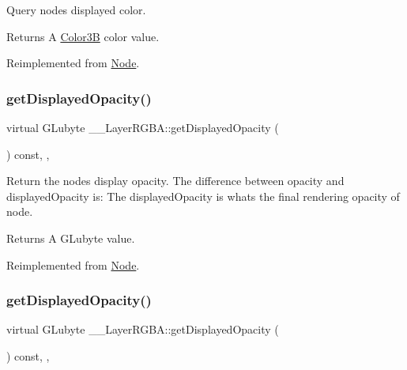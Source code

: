 Query node\textquotesingle{}s displayed color. \begin{DoxyReturn}{Returns}
A \hyperlink{structColor3B}{Color3B} color value. 
\end{DoxyReturn}


Reimplemented from \hyperlink{classNode_a899760bbad414bfbe9fb51473e99c3eb}{Node}.

\mbox{\label{class____LayerRGBA_a3c94f57397e6c53127d1176d14ab25fe}} 
\subsubsection{\texorpdfstring{get\+Displayed\+Opacity()}{getDisplayedOpacity()}\hspace{0.1cm}{\footnotesize\ttfamily [1/2]}}
{\footnotesize\ttfamily virtual G\+Lubyte \+\_\+\+\_\+\+Layer\+R\+G\+B\+A\+::get\+Displayed\+Opacity (\begin{DoxyParamCaption}{ }\end{DoxyParamCaption}) const\hspace{0.3cm}{\ttfamily [inline]}, {\ttfamily [override]}, {\ttfamily [virtual]}}

Return the node\textquotesingle{}s display opacity. The difference between opacity and displayed\+Opacity is\+: The displayed\+Opacity is what\textquotesingle{}s the final rendering opacity of node. \begin{DoxyReturn}{Returns}
A G\+Lubyte value. 
\end{DoxyReturn}


Reimplemented from \hyperlink{classNode_ac4f9c61560c8862ebdaecbf79bf8a1b6}{Node}.

\mbox{\label{class____LayerRGBA_a3c94f57397e6c53127d1176d14ab25fe}} 
\subsubsection{\texorpdfstring{get\+Displayed\+Opacity()}{getDisplayedOpacity()}\hspace{0.1cm}{\footnotesize\ttfamily [2/2]}}
{\footnotesize\ttfamily virtual G\+Lubyte \+\_\+\+\_\+\+Layer\+R\+G\+B\+A\+::get\+Displayed\+Opacity (\begin{DoxyParamCaption}{ }\end{DoxyParamCaption}) const\hspace{0.3cm}{\ttfamily [inline]}, {\ttfamily [override]}, {\ttfamily [virtual]}}

